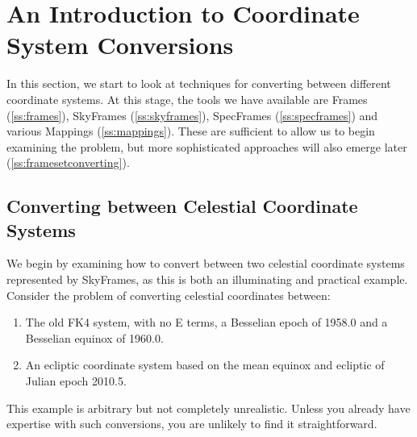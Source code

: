 \documentclass[twoside,11pt]{article}
\newcommand{\secref}[1]{\S\ref{#1}}
\renewcommand{\secref}[1]{\ref{#1}}
\begin{document}


\cleardoublepage
\section{\label{ss:introducingconversion}An Introduction to Coordinate System Conversions}

In this section, we start to look at techniques for converting between
different coordinate systems.  At this stage, the tools we have available
are Frames (\secref{ss:frames}), SkyFrames (\secref{ss:skyframes}),
SpecFrames (\secref{ss:specframes}) and various Mappings
(\secref{ss:mappings}). These are sufficient to allow us to begin
examining the problem, but more sophisticated approaches will also emerge
later (\secref{ss:framesetconverting}).

\subsection{\label{ss:convertingskyframes}Converting between Celestial Coordinate Systems}

We begin by examining how to convert between two celestial coordinate
systems represented by SkyFrames, as this is both an illuminating and
practical example.  Consider the problem of converting celestial
coordinates between:

\begin{enumerate}
\item The old FK4 system, with no E terms, a Besselian epoch of
1958.0 and a Besselian equinox of 1960.0.

\item An ecliptic coordinate system based on the mean equinox and
ecliptic of Julian epoch 2010.5.
\end{enumerate}

This example is arbitrary but not completely unrealistic. Unless you
already have expertise with such conversions, you are unlikely to find
it straightforward.
\end{document}
